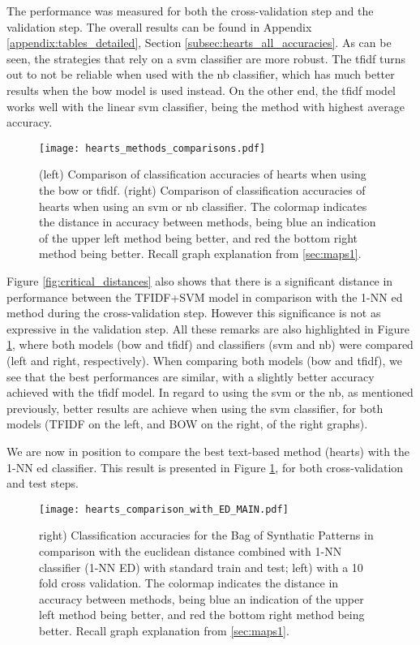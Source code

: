 The performance was measured for both the cross-validation step and the validation step. The overall results can be found in Appendix \ref{appendix:tables_detailed}, Section \ref{subsec:hearts_all_accuracies}. As can be seen, the strategies that rely on a \gls{svm} classifier are more robust. The \gls{tfidf} turns out to not be reliable when used with the \gls{nb} classifier, which has much better results when the \gls{bow} model is used instead. On the other end, the \gls{tfidf} model works well with the linear \gls{svm} classifier, being the method with highest average accuracy.

\begin{figure}
    \centering
    \texttt{[image: hearts\_methods\_comparisons.pdf]}
    \caption{(left) Comparison of classification accuracies of \gls{hearts} when using the \gls{bow} or \gls{tfidf}. (right) Comparison of classification accuracies of \gls{hearts} when using an \gls{svm} or \gls{nb} classifier. The colormap indicates the distance in accuracy between methods, being blue an indication of the upper left method being better, and red the bottom right method being better. Recall graph explanation from \ref{sec:maps1}.}
    \label{fig:comparison_2}
\end{figure}

Figure \ref{fig:critical_distances} also shows that there is a significant distance in performance between the TFIDF+SVM model in comparison with the 1-NN \gls{ed} method during the cross-validation step. However this significance is not as expressive in the validation step. All these remarks are also highlighted in Figure \ref{fig:comparison_2}, where both models (\gls{bow} and \gls{tfidf}) and classifiers (\gls{svm} and \gls{nb}) were compared (left and right, respectively).  When comparing both models (\gls{bow} and \gls{tfidf}), we see that the best performances are similar, with a slightly better accuracy achieved with the \gls{tfidf} model. In regard to using the \gls{svm} or the \gls{nb}, as mentioned previously, better results are achieve when using the \gls{svm} classifier, for both models (TFIDF on the left, and BOW on the right, of the right graphs).

We are now in position to compare the best text-based method (\gls{hearts}) with the 1-NN \gls{ed} classifier. This result is presented in Figure \ref{fig:comparison_2}, for both cross-validation and test steps.

\begin{figure}
    \centering
    \texttt{[image: hearts\_comparison\_with\_ED\_MAIN.pdf]}
    \caption{right) Classification accuracies for the Bag of Synthatic Patterns in comparison with the euclidean distance combined with 1-NN classifier (1-NN ED) with standard train and test; left) with a 10 fold cross validation. The colormap indicates the distance in accuracy between methods, being blue an indication of the upper left method being better, and red the bottom right method being better. Recall graph explanation from \ref{sec:maps1}.}
    \label{fig:ed_comparison}
\end{figure}

